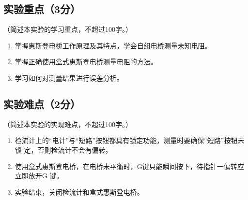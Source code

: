 \documentclass{../template/Report}%
\begin{document}
\subsection{实验重点（3分）}
（简述本实验的学习重点，不超过100字。）
\begin{enumerate}
    \item 掌握惠斯登电桥工作原理及其特点，学会自组电桥测量未知电阻。
    \item 掌握正确使用盒式惠斯登电桥测量电阻的方法。
    \item 学习如何对测量结果进行误差分析。
\end{enumerate}
\subsection{实验难点（2分）}
（简述本实验的实现难点，不超过100字。）
\begin{enumerate}
    \item  检流计上的“电计”与“短路”按钮都具有锁定功能，测量时要确保“短路”按钮未锁
    定，否则检流计不会有偏转。
    \item 使用盒式惠斯登电桥，在电桥未平衡时，G键只能瞬间按下，待指针一偏转应立即放开G
    键。
    \item 实验结束，关闭检流计和盒式惠斯登电桥。
\end{enumerate}
\end{document}
